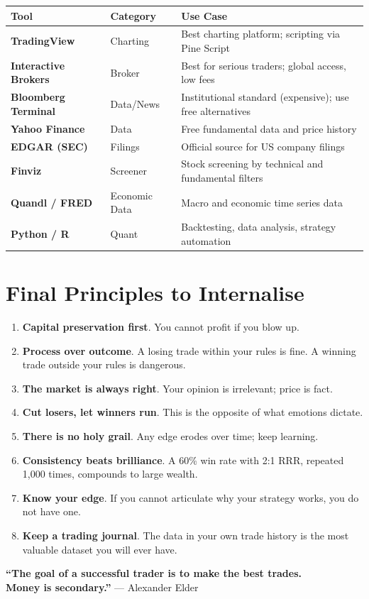 \begin{center}
\begin{tabular}{>{\bfseries}p{3.5cm} p{3cm} p{6.5cm}}
\toprule
Tool & Category & Use Case \\
\midrule
TradingView & Charting & Best charting platform; scripting via Pine Script \\
Interactive Brokers & Broker & Best for serious traders; global access, low fees \\
Bloomberg Terminal & Data/News & Institutional standard (expensive); use free alternatives \\
Yahoo Finance & Data & Free fundamental data and price history \\
EDGAR (SEC) & Filings & Official source for US company filings \\
Finviz & Screener & Stock screening by technical and fundamental filters \\
Quandl / FRED & Economic Data & Macro and economic time series data \\
Python / R & Quant & Backtesting, data analysis, strategy automation \\
\bottomrule
\end{tabular}
\end{center}

\section{Final Principles to Internalise}

\begin{enumerate}[label=\textbf{\Roman*.}]
  \item \textbf{Capital preservation first}. You cannot profit if you blow up.
  \item \textbf{Process over outcome}. A losing trade within your rules is fine.
        A winning trade outside your rules is dangerous.
  \item \textbf{The market is always right}. Your opinion is irrelevant; price is fact.
  \item \textbf{Cut losers, let winners run}. This is the opposite of what emotions dictate.
  \item \textbf{There is no holy grail}. Any edge erodes over time; keep learning.
  \item \textbf{Consistency beats brilliance}. A 60\% win rate with 2:1 RRR,
        repeated 1{,}000 times, compounds to large wealth.
  \item \textbf{Know your edge}. If you cannot articulate why your strategy works,
        you do not have one.
  \item \textbf{Keep a trading journal}. The data in your own trade history is the
        most valuable dataset you will ever have.
\end{enumerate}

\vspace{2em}
\begin{tcolorbox}[colback=lightblue, colframe=darkblue]
\centering
\textbf{``The goal of a successful trader is to make the best trades.\\
Money is secondary.''} — Alexander Elder
\end{tcolorbox}
